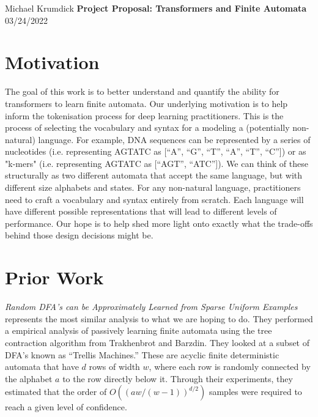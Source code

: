 \documentclass[11pt]{article}
\begin{document}
\Large \noindent Michael Krumdick \newline
\Large \textbf{Project Proposal: Transformers and Finite Automata} \newline
\Large 03/24/2022 \newline

\normalsize

\section{Motivation}
The goal of this work is to better understand and quantify the ability for
transformers \cite{transformer} to learn finite automata. Our underlying
motivation is to help inform the tokenisation process for deep learning
practitioners.  This is the process of selecting the vocabulary and syntax for a
modeling a (potentially non-natural) language. For example, DNA sequences can be
represented by a series of nucleotides (i.e. representing AGTATC as [``A'',
``G'', ``T'', ``A'', ``T'', ``C'']) or as "k-mers" (i.e. representing AGTATC as
[``AGT'', ``ATC'']). We can think of these structurally as two different
automata that accept the same language, but with different size alphabets and
states. For any non-natural language, practitioners need to
craft a vocabulary and syntax entirely from scratch. Each language will have different
possible representations that will lead to different levels of performance. Our
hope is to help shed more light onto exactly what the trade-offs behind those
design decisions might be.

\section{Prior Work}

\textit{Random DFA's can be Approximately Learned from Sparse Uniform Examples}
\cite{Lang98} represents the most similar analysis to what we are hoping to do.
They performed a empirical analysis of passively learning finite automata using
the tree contraction algorithm from Trakhenbrot and Barzdin. They looked at a
subset of DFA's known as ``Trellis Machines.'' These are acyclic finite
deterministic automata that have $d$ rows of width $w$, where each row is
randomly connected by the alphabet $a$ to the row directly below it.  Through
their experiments, they estimated that the order of $O((a w/(w - 1))^{d/2})$
samples were required to reach a given level of confidence. 
\end{document}
